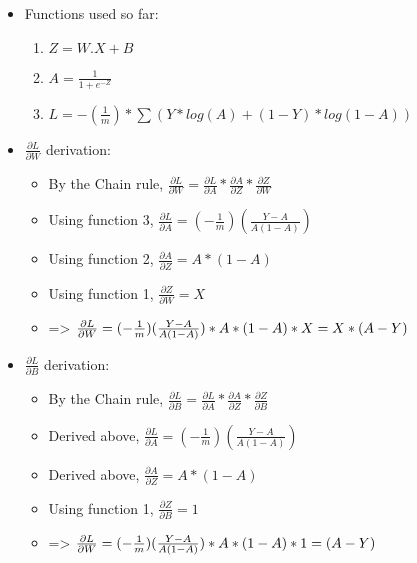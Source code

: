 \documentclass[10pt,a4paper]{article}
\begin{document}
\begin{itemize}
    \item Functions used so far:
    \begin{enumerate}
        \item $Z = W . X + B$
        \item $A = \frac{1}{1+e^{-Z}}$
        \item $L = -(\frac{1}{m}) * \sum(Y * log(A) + (1-Y) * log(1-A))$
    \end{enumerate}
    \item $\frac{\partial{L}}{\partial{W}}$ derivation:
    \begin{itemize}
        \item By the Chain rule, $\frac{\partial{L}}{\partial{W}} = \frac{\partial{L}}{\partial{A}} * \frac{\partial{A}}{\partial{Z}} * \frac{\partial{Z}}{\partial{W}}$
        \item Using function 3, $\frac{\partial{L}}{\partial{A}} = (-\frac{1}{m})(\frac{Y-A}{A(1-A)})$
        \item Using function 2, $\frac{\partial{A}}{\partial{Z}} = A * (1-A)$
        \item Using function 1, $\frac{\partial{Z}}{\partial{W}} = X$
        \item => $\frac{\partial{L}}{\partial{W}} = (-\frac{1}{m})(\frac{Y-A}{A(1-A)}) * A * (1-A) * X\\
              = X * (A-Y)$
    \end{itemize}
    \item $\frac{\partial{L}}{\partial{B}}$ derivation:
    \begin{itemize}
        \item By the Chain rule, $\frac{\partial{L}}{\partial{B}} = \frac{\partial{L}}{\partial{A}} * \frac{\partial{A}}{\partial{Z}} * \frac{\partial{Z}}{\partial{B}}$
        \item Derived above, $\frac{\partial{L}}{\partial{A}} = (-\frac{1}{m})(\frac{Y-A}{A(1-A)})$
        \item Derived above, $\frac{\partial{A}}{\partial{Z}} = A * (1-A)$
        \item Using function 1, $\frac{\partial{Z}}{\partial{B}} = 1$
        \item => $\frac{\partial{L}}{\partial{W}} = (-\frac{1}{m})(\frac{Y-A}{A(1-A)}) * A * (1-A) * 1\\
              = (A-Y)$
    \end{itemize}
\end{itemize}
\end{document}
